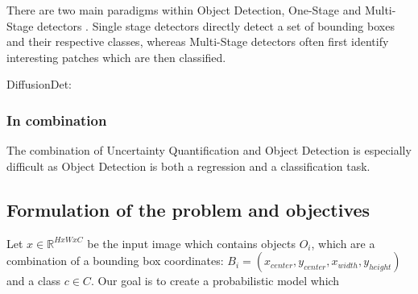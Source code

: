 There are two main paradigms within Object Detection, One-Stage \cite{zhou2019objects, bochkovskiy2020yolov4, wang2022yolov7} and Multi-Stage detectors \cite{girshick2014rich, girshick2015fast, }. Single stage detectors directly detect a set of bounding boxes and their respective classes, whereas Multi-Stage detectors often first identify interesting patches which are then classified.

DiffusionDet: \cite{chen2023diffusiondet}







\subsubsection{In combination}\label{sec:broadliterature:combination}
The combination of Uncertainty Quantification and Object Detection is especially difficult as Object Detection is both a regression and a classification task.

\cite{Gasperini_2022}

\subsection{Formulation of the problem and objectives}
Let $x \in \mathbb{R}^{HxWxC}$ be the input image which contains objects $O_i$, which are a combination of a bounding box coordinates: $B_i = (x_{center}, y_{center}, x_{width}, y_{height})$ and a class $c \in C$. Our goal is to create a probabilistic model which

\cite{Gasperini_2022}






